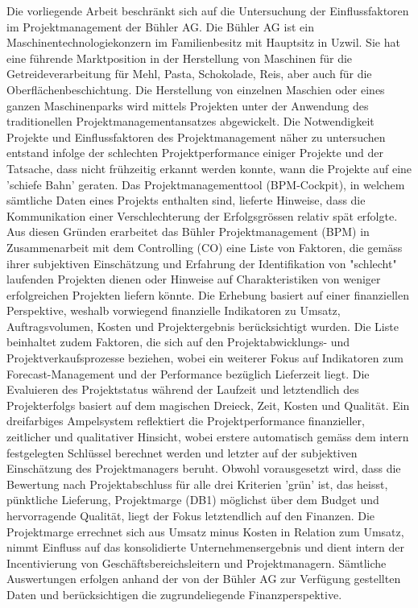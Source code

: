 \newline\newline Die vorliegende Arbeit beschränkt sich auf die Untersuchung der Einflussfaktoren im Projektmanagement der Bühler AG. Die Bühler AG ist ein Maschinentechnologiekonzern im Familienbesitz mit Hauptsitz in Uzwil. Sie hat eine führende Marktposition in der Herstellung von Maschinen für die Getreideverarbeitung für Mehl, Pasta, Schokolade, Reis, aber auch für die Oberflächenbeschichtung. Die Herstellung von einzelnen Maschien oder eines ganzen Maschinenparks wird mittels Projekten unter der Anwendung des traditionellen Projektmanagementansatzes abgewickelt. Die Notwendigkeit Projekte und Einflussfaktoren des Projektmanagement näher zu untersuchen entstand infolge der schlechten Projektperformance einiger Projekte und der Tatsache, dass nicht frühzeitig erkannt werden konnte, wann die Projekte auf eine 'schiefe Bahn' geraten. Das Projektmanagementtool (BPM-Cockpit), in welchem sämtliche Daten eines Projekts enthalten sind, lieferte Hinweise, dass die Kommunikation einer Verschlechterung der Erfolgsgrössen relativ spät erfolgte. Aus diesen Gründen erarbeitet das Bühler Projektmanagement (BPM) in Zusammenarbeit mit dem Controlling (CO) eine Liste von Faktoren, die gemäss ihrer subjektiven Einschätzung und Erfahrung der Identifikation von "schlecht" laufenden Projekten dienen oder Hinweise auf Charakteristiken von weniger erfolgreichen Projekten liefern könnte. Die Erhebung basiert auf einer finanziellen Perspektive, weshalb vorwiegend finanzielle Indikatoren zu Umsatz, Auftragsvolumen, Kosten und Projektergebnis berücksichtigt wurden. Die Liste beinhaltet zudem Faktoren, die sich auf den Projektabwicklungs- und Projektverkaufsprozesse beziehen, wobei ein weiterer Fokus auf Indikatoren zum Forecast-Management und der Performance bezüglich Lieferzeit liegt. Die Evaluieren des Projektstatus während der Laufzeit und letztendlich des Projekterfolgs basiert auf dem magischen Dreieck, Zeit, Kosten und Qualität. Ein dreifarbiges Ampelsystem reflektiert die Projektperformance finanzieller, zeitlicher und qualitativer Hinsicht, wobei erstere automatisch gemäss dem intern festgelegten Schlüssel berechnet werden und letzter auf der subjektiven Einschätzung des Projektmanagers beruht. Obwohl vorausgesetzt wird, dass die Bewertung nach Projektabschluss für alle drei Kriterien 'grün' ist, das heisst, pünktliche Lieferung, Projektmarge (DB1) möglichst über dem Budget und hervorragende Qualität, liegt der Fokus letztendlich auf den Finanzen. Die Projektmarge errechnet sich aus Umsatz minus Kosten in Relation zum Umsatz, nimmt Einfluss auf das konsolidierte Unternehmensergebnis und dient intern der Incentivierung von Geschäftsbereichsleitern und Projektmanagern. Sämtliche Auswertungen erfolgen anhand der von der Bühler AG zur Verfügung gestellten Daten und berücksichtigen die zugrundeliegende Finanzperspektive. 
